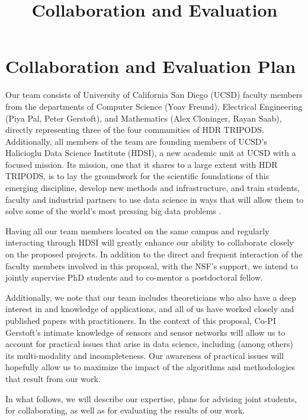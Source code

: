 \documentclass{article}
\title{Collaboration and Evaluation}
\begin{document}
\section*{Collaboration and Evaluation Plan}

Our team consists of University of California San Diego (UCSD) faculty
members from the departments of Computer Science (Yoav Freund),
Electrical Engineering (Piya Pal, Peter Gerstoft), and Mathematics
(Alex Cloninger, Rayan Saab), directly representing three of the four
communities of HDR TRIPODS.  Additionally, all members of the team are
founding members of UCSD's Halicioglu Data Science Institute (HDSI), a
new academic unit at UCSD with a focused mission. Its mission, one
that it shares to a large extent with HDR TRIPODS, is to lay the
groundwork for the scientific foundations of this emerging discipline,
develop new methods and infrastructure, and train students, faculty
and industrial partners to use data science in ways that will allow
them to solve some of the world’s most pressing big data problems \cite{the
  HDSI website}.

Having all our team members located on the same campus and regularly
interacting through HDSI will greatly enhance our ability to
collaborate closely on the proposed projects. In addition to the
direct and frequent interaction of the faculty members involved in
this proposal, with the NSF's support, we intend to jointly supervise
PhD students and to co-mentor a postdoctoral fellow.

Additionally, we note that our team includes theoreticians who also
have a deep interest in and knowledge of applications, and all
of us have worked closely and
published papers with practitioners. In the context of this proposal,
Co-PI Gerstoft's intimate knowledge of sensors and sensor networks
will allow us to account for practical issues that arise in data
science, including (among others) its multi-modality and
incompleteness. Our awareness of practical issues will hopefully allow
us to maximize the impact of the algorithms and methodologies that
result from our work.   

In what follows, we will describe our expertise, plans for advising
joint students, for collaborating, as well as for evaluating the
results of our work.
 
\end{document}
